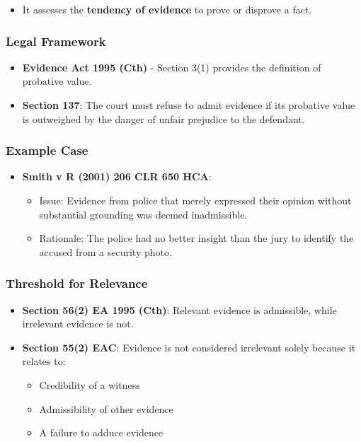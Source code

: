 \begin{itemize}
\tightlist
\item
  It assesses the \textbf{tendency of evidence} to prove or disprove a
  fact.
\end{itemize}

\subsubsection{Legal Framework}\label{legal-framework-1}

\begin{itemize}
\tightlist
\item
  \textbf{Evidence Act 1995 (Cth)} - Section 3(1) provides the
  definition of probative value.
\item
  \textbf{Section 137}: The court must refuse to admit evidence if its
  probative value is outweighed by the danger of unfair prejudice to the
  defendant.
\end{itemize}

\subsubsection{Example Case}\label{example-case}

\begin{itemize}
\tightlist
\item
  \textbf{Smith v R (2001) 206 CLR 650 HCA}:

  \begin{itemize}
  \tightlist
  \item
    Issue: Evidence from police that merely expressed their opinion
    without substantial grounding was deemed inadmissible.
  \item
    Rationale: The police had no better insight than the jury to
    identify the accused from a security photo.
  \end{itemize}
\end{itemize}

\subsubsection{Threshold for Relevance}\label{threshold-for-relevance}

\begin{itemize}
\tightlist
\item
  \textbf{Section 56(2) EA 1995 (Cth)}: Relevant evidence is admissible,
  while irrelevant evidence is not.
\item
  \textbf{Section 55(2) EAC}: Evidence is not considered irrelevant
  solely because it relates to:

  \begin{itemize}
  \tightlist
  \item
    Credibility of a witness
  \item
    Admissibility of other evidence
  \item
    A failure to adduce evidence
  \end{itemize}
\end{itemize}

